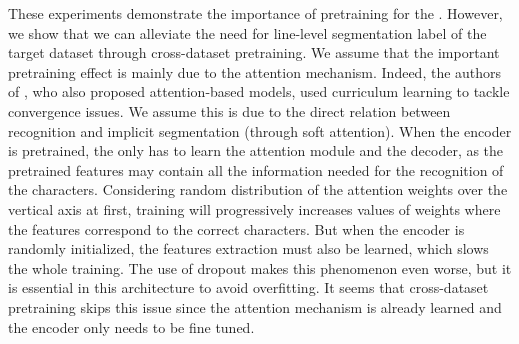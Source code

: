 \begin{table}[!h]
    \caption{Comparison between cross-dataset pretraining and line-level pretraining for the \modelacc{}. Results are given on the test sets.}
    \centering
    \label{table:cross}
\end{table}

These experiments demonstrate the importance of pretraining for the \modelacc{}. However, we show that we can alleviate the need for line-level segmentation label of the target dataset through cross-dataset pretraining. We assume that the important pretraining effect is mainly due to the attention mechanism. Indeed, the authors of \cite{Bluche2016,Bluche2017}, who also proposed attention-based models, used curriculum learning to tackle convergence issues. We assume this is due to the direct relation between recognition and implicit segmentation (through soft attention). When the encoder is pretrained, the \modelacc{} only has to learn the attention module and the decoder, as the pretrained features may contain all the information needed for the recognition of the characters. Considering random distribution of the attention weights over the vertical axis at first, training will progressively increases values of weights where the features correspond to the correct characters. But when the encoder is randomly initialized, the features extraction must also be learned, which slows the whole training. The use of dropout makes this phenomenon even worse, but it is essential in this architecture to avoid overfitting. It seems that cross-dataset pretraining skips this issue since the attention mechanism is already learned and the encoder only needs to be fine tuned.


